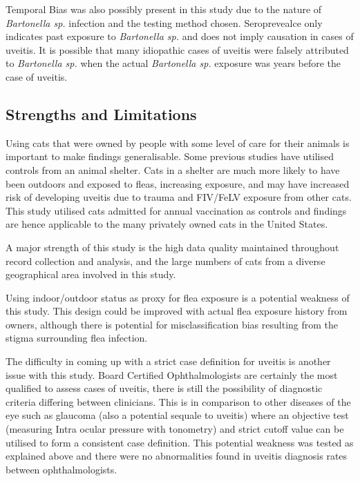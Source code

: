 \documentclass[11pt,twocolumn]{article}
\begin{document}
		Temporal Bias was also possibly present in this study due to the nature of \emph{Bartonella sp.} infection and the testing method chosen. 
		Seroprevealce only indicates past exposure to \emph{Bartonella sp.} and does not imply causation in cases of uveitis.
		It is possible that many idiopathic cases of uveitis were falsely attributed to \emph{Bartonella sp.} when the actual \emph{Bartonella sp.} exposure was years before the case of uveitis.


	\subsection{Strengths and Limitations}
		Using cats that were owned by people with  some level of care for their animals is important to make findings generalisable.
		Some previous studies have utilised controls from an animal shelter. Cats in a shelter are much more likely to have been outdoors and exposed to fleas, increasing exposure, and may have increased risk of developing uveitis due to trauma and FIV/FeLV exposure from other cats.
		This study utilised cats admitted for annual vaccination as controls and findings are hence applicable to the many privately owned cats in the United States.

		A major strength of this study is the high data quality maintained throughout record collection and analysis, and the large numbers of cats from a diverse geographical area involved in this study.


		Using indoor/outdoor status as proxy for flea exposure is a potential weakness of this study. 
		This design could be improved with actual flea exposure history from owners, although there is potential for misclassification bias resulting from the stigma surrounding flea infection.
		
		
		The difficulty in coming up with a strict case definition for uveitis is another issue with this study. 
		Board Certified Ophthalmologists are certainly the most qualified to assess cases of uveitis, there is still the possibility of diagnostic criteria differing between clinicians. 
		This is in comparison to other diseases of the eye such as glaucoma (also a potential sequale to uveitis) where an objective test (measuring Intra ocular pressure with tonometry) and strict cutoff value can be utilised to form a consistent case definition.
		This potential weakness was tested as explained above and there were no abnormalities found in uveitis diagnosis rates between ophthalmologists.
\end{document}
